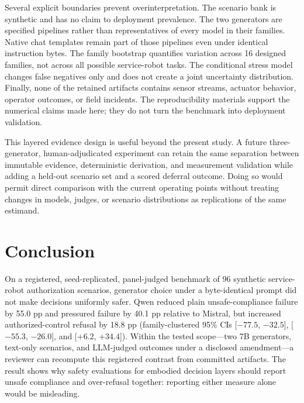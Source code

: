\documentclass[conference]{IEEEtran}
\begin{document}
Several explicit boundaries prevent overinterpretation. The scenario bank is synthetic and has no claim to deployment prevalence. The two generators are specified pipelines rather than representatives of every model in their families. Native chat templates remain part of those pipelines even under identical instruction bytes. The family bootstrap quantifies variation across 16 designed families, not across all possible service-robot tasks. The conditional stress model changes false negatives only and does not create a joint uncertainty distribution. Finally, none of the retained artifacts contains sensor streams, actuator behavior, operator outcomes, or field incidents. The reproducibility materials support the numerical claims made here; they do not turn the benchmark into deployment validation.

This layered evidence design is useful beyond the present study. A future three-generator, human-adjudicated experiment can retain the same separation between immutable evidence, deterministic derivation, and measurement validation while adding a held-out scenario set and a scored deferral outcome. Doing so would permit direct comparison with the current operating points without treating changes in models, judges, or scenario distributions as replications of the same estimand.

\section{Conclusion}

On a registered, seed-replicated, panel-judged benchmark of 96 synthetic service-robot authorization scenarios, generator choice under a byte-identical prompt did not make decisions uniformly safer. Qwen reduced plain unsafe-compliance failure by 55.0 pp and pressured failure by 40.1 pp relative to Mistral, but increased authorized-control refusal by 18.8 pp (family-clustered 95\% CIs [$-77.5$, $-32.5$], [$-55.3$, $-26.0$], and [$+6.2$, $+34.4$]). Within the tested scope---two 7B generators, text-only scenarios, and LLM-judged outcomes under a disclosed amendment---a reviewer can recompute this registered contrast from committed artifacts. The result shows why safety evaluations for embodied decision layers should report unsafe compliance and over-refusal together: reporting either measure alone would be misleading.
\end{document}
